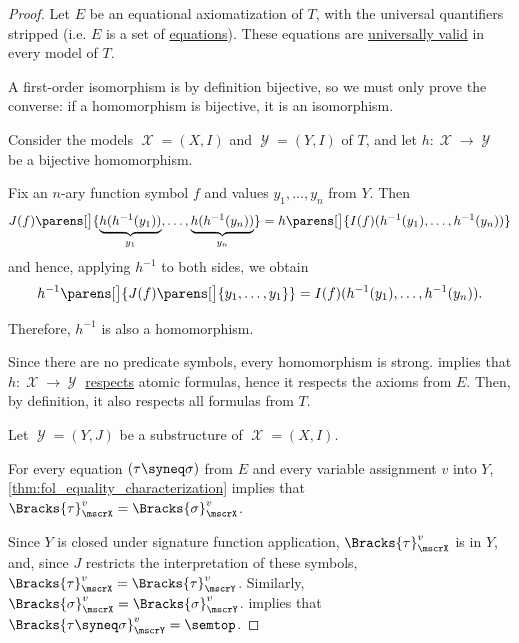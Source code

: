 \begin{proof}
  Let \( E \) be an equational axiomatization of \( T \), with the universal quantifiers stripped (i.e. \( E \) is a set of \hyperref[def:fol_equation]{equations}). These equations are \hyperref[def:fol_universal_validity]{universally valid} in every model of \( T \).

   A first-order isomorphism is by definition bijective, so we must only prove the converse: if a homomorphism is bijective, it is an isomorphism.

  Consider the models \( \mscrX = (X, I) \) and \( \mscrY = (Y, I) \) of \( T \), and let \( h: \mscrX \to \mscrY \) be a bijective homomorphism.

  Fix an \( n \)-ary function symbol \( f \) and values \( y_1, \ldots, y_n \) from \( Y \). Then
  \begin{equation*}
    J(f)\parens[\big]{ \underbrace{h(h^{-1}(y_1))}_{y_1}, \ldots, \underbrace{h(h^{-1}(y_n))}_{y_n} }
    =
    h\parens[\big]{ I(f)(h^{-1}(y_1), \ldots, h^{-1}(y_n)) }
  \end{equation*}
  and hence, applying \( h^{-1} \) to both sides, we obtain
  \begin{equation*}
    h^{-1}\parens[\big]{ J(f)\parens[\big]{ y_1, \ldots, y_1 } }
    =
    I(f)(h^{-1}(y_1), \ldots, h^{-1}(y_n)).
  \end{equation*}

  Therefore, \( h^{-1} \) is also a homomorphism.

   Since there are no predicate symbols, every homomorphism is strong.  implies that \( h: \mscrX \to \mscrY \) \hyperref[def:fol_function_respect/formula]{respects} atomic formulas, hence it respects the axioms from \( E \). Then, by definition, it also respects all formulas from \( T \).

   Let \( \mscrY = (Y, J) \) be a substructure of \( \mscrX = (X, I) \).

  For every equation \( (\tau \syneq \sigma) \) from \( E \) and every variable assignment \( v \) into \( Y \), \cref{thm:fol_equality_characterization} implies that \( \Bracks{\tau}_\mscrX^v = \Bracks{\sigma}_\mscrX^v \).

  Since \( Y \) is closed under signature function application, \( \Bracks{\tau}_\mscrX^v \) is in \( Y \), and, since \( J \) restricts the interpretation of these symbols, \( \Bracks{\tau}_\mscrX^v = \Bracks{\tau}_\mscrY^v \). Similarly, \( \Bracks{\sigma}_\mscrX^v = \Bracks{\sigma}_\mscrY^v \).  implies that \( \Bracks{\tau \syneq \sigma}_\mscrY^v = \semtop \).


\end{proof}
